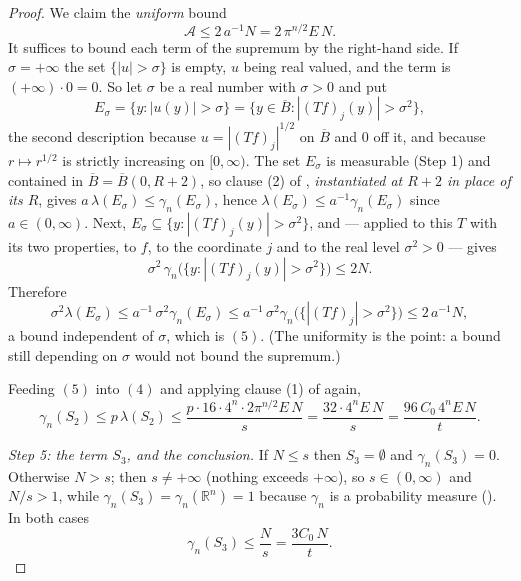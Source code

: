 \begin{proof}
We claim the \emph{uniform} bound
\begin{equation*}
  \mathcal{A} \leq 2\,a^{-1}N = 2\,\pi^{n/2}E\,N . \tag{5}
\end{equation*}
It suffices to bound each term of the supremum by the right-hand side.  If
$\sigma = +\infty$ the set $\{|u| > \sigma\}$ is empty, $u$ being real valued,
and the term is $(+\infty)\cdot0 = 0$.  So let $\sigma$ be a real number with
$\sigma > 0$ and put
\[
  E_\sigma = \{y : |u(y)| > \sigma\}
    = \{y \in \overline B : |(Tf)_j(y)| > \sigma^2\} ,
\]
the second description because $u = |(Tf)_j|^{1/2}$ on $\overline B$ and $0$
off it, and because $r \mapsto r^{1/2}$ is strictly increasing on $[0,\infty)$.
The set $E_\sigma$ is measurable (Step 1) and contained in
$\overline B = \overline B(0,R+2)$, so clause (2) of
, \emph{instantiated at $R+2$ in place of
its $R$}, gives $a\,\lambda(E_\sigma) \leq \gamma_n(E_\sigma)$, hence
$\lambda(E_\sigma) \leq a^{-1}\gamma_n(E_\sigma)$ since $a \in (0,\infty)$.
Next, $E_\sigma \subseteq \{y : |(Tf)_j(y)| > \sigma^2\}$, and
 --- applied to this $T$ with its two
properties, to $f$, to the coordinate $j$ and to the real level
$\sigma^2 > 0$ --- gives
\[
  \sigma^2\,\gamma_n\bigl(\{y : |(Tf)_j(y)| > \sigma^2\}\bigr) \leq 2N .
\]
Therefore
\[
  \sigma^2\lambda(E_\sigma)
    \leq a^{-1}\,\sigma^2\gamma_n(E_\sigma)
    \leq a^{-1}\,\sigma^2\gamma_n\bigl(\{|(Tf)_j| > \sigma^2\}\bigr)
    \leq 2\,a^{-1}N ,
\]
a bound independent of $\sigma$, which is $(5)$.  (The uniformity is the point:
a bound still depending on $\sigma$ would not bound the supremum.)

Feeding $(5)$ into $(4)$ and applying clause (1) of
 again,
\begin{equation*}
  \gamma_n(S_2) \leq p\,\lambda(S_2)
    \leq \frac{p\cdot16\cdot4^n\cdot2\pi^{n/2}E\,N}{s}
    = \frac{32\cdot4^nE\,N}{s}
    = \frac{96\,C_0\,4^nE\,N}{t} . \tag{6}
\end{equation*}

\emph{Step 5: the term $S_3$, and the conclusion.}
If $N \leq s$ then $S_3 = \emptyset$ and $\gamma_n(S_3) = 0$.  Otherwise
$N > s$; then $s \neq +\infty$ (nothing exceeds $+\infty$), so
$s \in (0,\infty)$ and $N/s > 1$, while $\gamma_n(S_3) = \gamma_n(\mathbb{R}^n)
 = 1$ because $\gamma_n$ is a probability measure ().
In both cases
\begin{equation*}
  \gamma_n(S_3) \leq \frac{N}{s} = \frac{3C_0\,N}{t} . \tag{7}
\end{equation*}


\end{proof}
